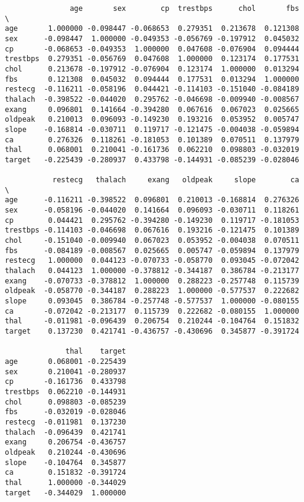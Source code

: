 \documentclass[11pt]{article}
\begin{document}
    
    \begin{verbatim}
               age       sex        cp  trestbps      chol       fbs  \
age       1.000000 -0.098447 -0.068653  0.279351  0.213678  0.121308   
sex      -0.098447  1.000000 -0.049353 -0.056769 -0.197912  0.045032   
cp       -0.068653 -0.049353  1.000000  0.047608 -0.076904  0.094444   
trestbps  0.279351 -0.056769  0.047608  1.000000  0.123174  0.177531   
chol      0.213678 -0.197912 -0.076904  0.123174  1.000000  0.013294   
fbs       0.121308  0.045032  0.094444  0.177531  0.013294  1.000000   
restecg  -0.116211 -0.058196  0.044421 -0.114103 -0.151040 -0.084189   
thalach  -0.398522 -0.044020  0.295762 -0.046698 -0.009940 -0.008567   
exang     0.096801  0.141664 -0.394280  0.067616  0.067023  0.025665   
oldpeak   0.210013  0.096093 -0.149230  0.193216  0.053952  0.005747   
slope    -0.168814 -0.030711  0.119717 -0.121475 -0.004038 -0.059894   
ca        0.276326  0.118261 -0.181053  0.101389  0.070511  0.137979   
thal      0.068001  0.210041 -0.161736  0.062210  0.098803 -0.032019   
target   -0.225439 -0.280937  0.433798 -0.144931 -0.085239 -0.028046   

           restecg   thalach     exang   oldpeak     slope        ca  \
age      -0.116211 -0.398522  0.096801  0.210013 -0.168814  0.276326   
sex      -0.058196 -0.044020  0.141664  0.096093 -0.030711  0.118261   
cp        0.044421  0.295762 -0.394280 -0.149230  0.119717 -0.181053   
trestbps -0.114103 -0.046698  0.067616  0.193216 -0.121475  0.101389   
chol     -0.151040 -0.009940  0.067023  0.053952 -0.004038  0.070511   
fbs      -0.084189 -0.008567  0.025665  0.005747 -0.059894  0.137979   
restecg   1.000000  0.044123 -0.070733 -0.058770  0.093045 -0.072042   
thalach   0.044123  1.000000 -0.378812 -0.344187  0.386784 -0.213177   
exang    -0.070733 -0.378812  1.000000  0.288223 -0.257748  0.115739   
oldpeak  -0.058770 -0.344187  0.288223  1.000000 -0.577537  0.222682   
slope     0.093045  0.386784 -0.257748 -0.577537  1.000000 -0.080155   
ca       -0.072042 -0.213177  0.115739  0.222682 -0.080155  1.000000   
thal     -0.011981 -0.096439  0.206754  0.210244 -0.104764  0.151832   
target    0.137230  0.421741 -0.436757 -0.430696  0.345877 -0.391724   

              thal    target  
age       0.068001 -0.225439  
sex       0.210041 -0.280937  
cp       -0.161736  0.433798  
trestbps  0.062210 -0.144931  
chol      0.098803 -0.085239  
fbs      -0.032019 -0.028046  
restecg  -0.011981  0.137230  
thalach  -0.096439  0.421741  
exang     0.206754 -0.436757  
oldpeak   0.210244 -0.430696  
slope    -0.104764  0.345877  
ca        0.151832 -0.391724  
thal      1.000000 -0.344029  
target   -0.344029  1.000000  
    \end{verbatim}
\end{document}

